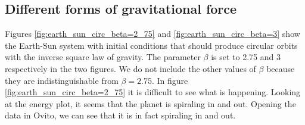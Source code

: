 \documentclass[reprint, english,notitlepage,nofootinbib]{revtex4-1}  %
\begin{document}
\subsection{Different forms of gravitational force}

Figures \ref{fig:earth_sun_circ_beta=2_75} and \ref{fig:earth_sun_circ_beta=3} show the Earth-Sun system with initial conditions that should produce circular orbits with the inverse square law of gravity. The parameter $\beta$ is set to 2.75 and 3 respectively in the two figures. We do not include the other values of $\beta$ because they are indistinguishable from $\beta = 2.75$. In figure \ref{fig:earth_sun_circ_beta=2_75} it is difficult to see what is happening. Looking at the energy plot, it seems that the planet is spiraling in and out. Opening the data in Ovito, we can see that it is in fact spiraling in and out.
\end{document}
